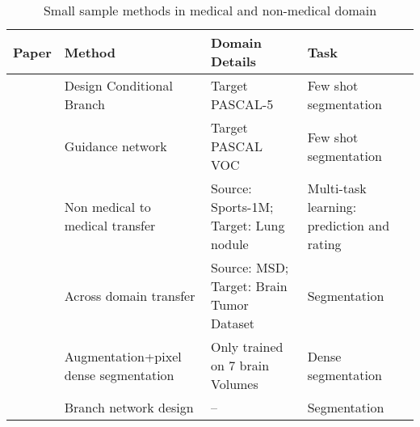 \begin{table}
\begin{tabular}{p{1cm} p{5cm} p{4cm} p{4cm}}
\hline
Paper    & Method                                & Domain Details                                          & Task                                       \\
\hline
{\cite{shaban_one-shot_2017}} & Design Conditional Branch             & Target PASCAL-5        & Few shot segmentation                      \\
{\cite{rakelly_few-shot_nodate}} & Guidance network                      & Target PASCAL VOC             & Few shot segmentation                      \\
{\cite{hussein_risk_2017}} & Non medical to medical transfer       & Source: Sports-1M;  Target: Lung nodule                  & Multi-task learning: prediction and rating \\
{\cite{wang_improving_2019}} & Across domain transfer                & Source: MSD; Target: Brain Tumor Dataset & Segmentation                               \\
{\cite{shaban_one-shot_2017}} & Augmentation+pixel dense segmentation & Only trained on 7 brain Volumes                         & Dense segmentation                         \\
{\cite{suk_brain_2019}}  & Branch network design                 & --                                                      & Segmentation                               \\
\hline
\end{tabular}
\caption{Small sample methods in medical and non-medical domain}
\label{tab:small sample learning}
\end{table}	



